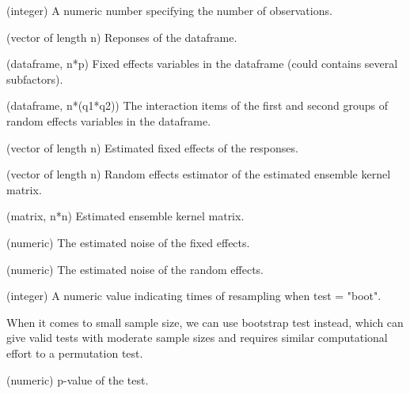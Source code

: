 \documentclass[a4paper]{book}
\begin{document}
\begin{Arguments}
\begin{ldescription}
\item[\code{n}] (integer) A numeric number specifying the number of observations.

\item[\code{Y}] (vector of length n) Reponses of the dataframe.

\item[\code{X}] (dataframe, n*p) Fixed effects variables in the dataframe (could
contains several subfactors).

\item[\code{Z12}] (dataframe, n*(q1\bsl{}*q2)) The interaction items of the first and
second groups of random effects variables in the dataframe.

\item[\code{y\_fixed}] (vector of length n) Estimated fixed effects of the
responses.

\item[\code{alpha0}] (vector of length n) Random effects estimator of the estimated
ensemble kernel matrix.

\item[\code{K\_ens}] (matrix, n*n) Estimated ensemble kernel matrix.

\item[\code{sigma2\_hat}] (numeric) The estimated noise of the fixed effects.

\item[\code{tau\_hat}] (numeric) The estimated noise of the random effects.

\item[\code{B}] (integer) A numeric value indicating times of resampling when test
= "boot".
\end{ldescription}
\end{Arguments}
%
\begin{Details}\relax
{}

When it comes to small sample size, we can use bootstrap test instead, which
can give valid tests with moderate sample sizes and requires similar
computational effort to a permutation test.
\end{Details}
%
\begin{Value}
\begin{ldescription}
\item[\code{pvalue}] (numeric) p-value of the test.
\end{ldescription}
\end{Value}
\end{document}
